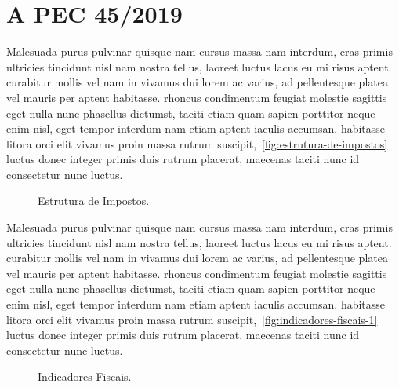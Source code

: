 \section{A PEC 45/2019}
\label{sec:a-pec-45-2019}

Malesuada purus pulvinar quisque nam cursus massa nam interdum, cras primis ultricies tincidunt nisl nam nostra tellus, laoreet luctus lacus eu mi risus aptent. curabitur mollis vel nam in vivamus dui lorem ac varius, ad pellentesque platea vel mauris per aptent habitasse. rhoncus condimentum feugiat molestie sagittis eget nulla nunc phasellus dictumst, taciti etiam quam sapien porttitor neque enim nisl, eget tempor interdum nam etiam aptent iaculis accumsan. habitasse litora orci elit vivamus proin massa rutrum suscipit,~\autoref{fig:estrutura-de-impostos} luctus donec integer primis duis rutrum placerat, maecenas taciti nunc id consectetur nunc luctus.

\begin{figure}[ht!]
    \centering
    \caption{Estrutura de Impostos.}
    \label{fig:estrutura-de-impostos}
\end{figure}

Malesuada purus pulvinar quisque nam cursus massa nam interdum, cras primis ultricies tincidunt nisl nam nostra tellus, laoreet luctus lacus eu mi risus aptent. curabitur mollis vel nam in vivamus dui lorem ac varius, ad pellentesque platea vel mauris per aptent habitasse. rhoncus condimentum feugiat molestie sagittis eget nulla nunc phasellus dictumst, taciti etiam quam sapien porttitor neque enim nisl, eget tempor interdum nam etiam aptent iaculis accumsan. habitasse litora orci elit vivamus proin massa rutrum suscipit,~\autoref{fig:indicadores-fiscais-1} luctus donec integer primis duis rutrum placerat, maecenas taciti nunc id consectetur nunc luctus.

\begin{figure}[ht!]
    \centering
    \caption{Indicadores Fiscais.}
    \label{fig:indicadores-fiscais-1}
\end{figure}